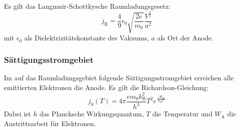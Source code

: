 Es gilt das Langmuir-Schottkysche Raumladungsgesetz:
\begin{equation}
  \label{eqn:langmuir}
  j_\mathrm{R}=\frac{4}{9} \epsilon_0 \sqrt{\frac{2e}{m_0}}\frac{V^{\frac{3}{2}}}{a^2}
\end{equation}
mit $\epsilon_0$ als Dielektrizitätskonstante des Vakuums, $a$ als Ort der Anode.

\subsubsection{Sättigungsstromgebiet}
Im auf das Raumladungsgebiet folgende Sättigungsstromgebiet erreichen alle emittierten Elektronen die Anode. Es gilt die Richardson-Gleichung:
\begin{equation}
  \label{eqn:richardson}
j_\mathrm{S}(T)=4\pi\frac{e m_0 k_\mathrm{B}^2}{h^3}T^2e^{\frac{-W_\mathrm{A}}{k_\mathrm{B}T}}
\end{equation}
Dabei ist $h$ das Plancksche Wirkungsquantum, $T$ die Temperatur und $W_\mathrm{A}$ die Austrittsarbeit für Elektronen.
